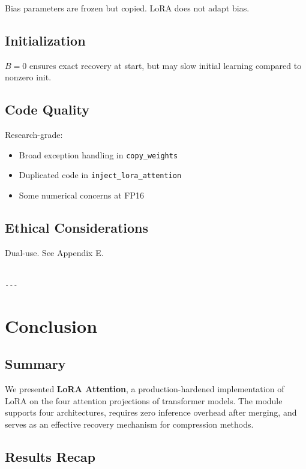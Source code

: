 Bias parameters are frozen but copied. LoRA does not adapt bias.

\subsection{Initialization}

$B = 0$ ensures exact recovery at start, but may slow initial learning 
compared to nonzero init.

\subsection{Code Quality}

Research-grade:
\begin{itemize}
\item Broad exception handling in \texttt{copy\_weights}
\item Duplicated code in \texttt{inject\_lora\_attention}
\item Some numerical concerns at FP16

\end{itemize}
\subsection{Ethical Considerations}

Dual-use. See Appendix E.
\begin{lstlisting}

---
\end{lstlisting}

\section{Conclusion}

\subsection{Summary}

We presented \textbf{LoRA Attention}, a production-hardened implementation of 
LoRA on the four attention projections of transformer models. The module 
supports four architectures, requires zero inference overhead after merging, 
and serves as an effective recovery mechanism for compression methods.

\subsection{Results Recap}


